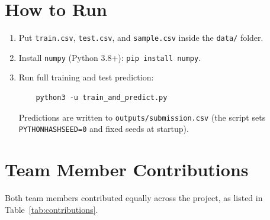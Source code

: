 \documentclass[11pt,a4paper]{article}
\begin{document}
\section{How to Run}

\begin{enumerate}[noitemsep]
    \item Put \texttt{train.csv}, \texttt{test.csv}, and \texttt{sample.csv} inside the \texttt{data/} folder.
    \item Install \texttt{numpy} (Python 3.8+): \texttt{pip install numpy}.
    \item Run full training and test prediction:
    \begin{verbatim}
    python3 -u train_and_predict.py
    \end{verbatim}
    Predictions are written to \texttt{outputs/submission.csv} (the script sets \texttt{PYTHONHASHSEED=0} and fixed seeds at startup).
\end{enumerate}

\section{Team Member Contributions}

Both team members contributed equally across the project, as listed in Table~\ref{tab:contributions}.
\end{document}
